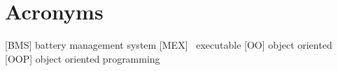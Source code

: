 \section*{Acronyms}
\thispagestyle{plain}
\begin{acronym}
	[BMS] battery management system
	[MEX] \matlab\ executable
	[OO] object oriented
	[OOP] object oriented programming
	
\end{acronym}
